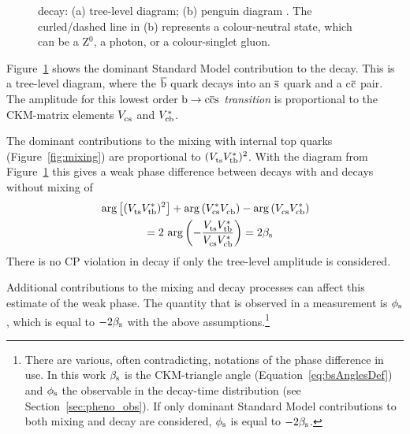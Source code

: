 \begin{figure}[hbt]
  \centering
  \begin{subfigure}{0.5\textwidth}
    \centering
    
    \caption{}
    \label{fig:decay_tree}
  \end{subfigure}%
  \begin{subfigure}{0.5\textwidth}
    \centering
    
    \caption{}
    \label{fig:decay_penguin}
  \end{subfigure}
  \caption{\BstoJpsiphi{} decay: (a) tree-level diagram; (b) penguin diagram \cite{LHCb-PAPER-2013-002}. The curled/dashed line in (b)
           represents a colour-neutral state, which can be a Z$^0$, a photon, or a colour-singlet gluon.}
  \label{fig:decay}
\end{figure}
Figure~\ref{fig:decay_tree} shows the dominant Standard Model contribution to the \BstoJpsiphi{} decay. This is a tree-level diagram,
where the $\qbar[b]$ quark decays into an $\qbar[s]$ quark and a c$\qbar[c]$ pair. The amplitude for this lowest order \emph{$\btoccs$
transition} is proportional to the CKM-matrix elements $\Vcs$ and $\Vcb[*]$.

The dominant contributions to the \BsBsbar{} mixing with internal top quarks (Figure~\ref{fig:mixing}) are proportional to
$(\Vts\Vtb[*])^2$. With the diagram from Figure~\ref{fig:decay_tree} this gives a weak phase difference between decays with and decays
without mixing of
\begin{equation}
  \label{eq:betasCKM}
  \begin{split}
    &\arg\left[(\Vts\Vtb[*])^2\right] + \arg\left(\Vcs[*]\Vcb\right) - \arg\left(\Vcs\Vcb[*]\right) \\
    &\qquad\qquad= 2\,\arg\left(-\frac{\Vts\Vtb[*]}{\Vcs\Vcb[*]}\right) = 2\bs
  \end{split}
\end{equation}
There is no CP violation in decay if only the tree-level amplitude is considered.

Additional contributions to the mixing and decay processes can affect this estimate of the weak phase. The quantity that is observed in a
measurement is $\phis$, which is equal to $-2\bs$ with the above assumptions.\footnote{There are various, often contradicting, notations
of the phase difference in use. In this work $\bs$ is the CKM-triangle angle (Equation~\ref{eq:bsAnglesDef}) and $\phis$ the observable in
the decay-time distribution (see Section~\ref{sec:pheno_obs}). If only dominant Standard Model contributions to both mixing and decay are
considered, $\phis$ is equal to $-2\bs$.}

